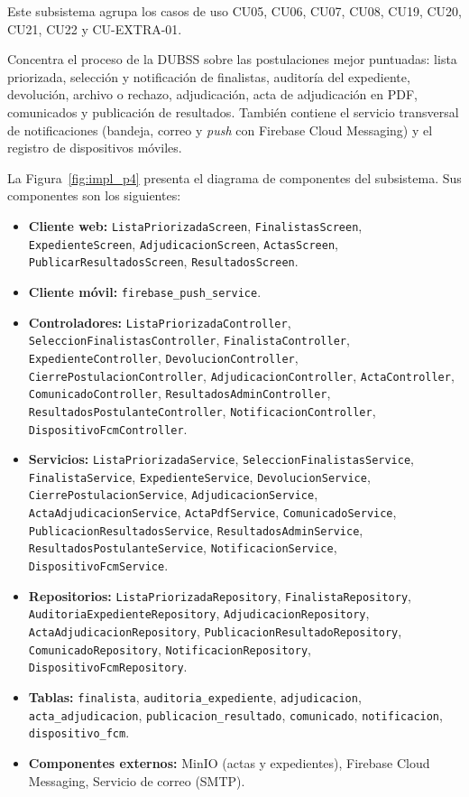 \label{sec:cap8_sub_p4}

Este subsistema agrupa los casos de uso CU05, CU06, CU07, CU08, CU19, CU20, CU21, CU22 y CU-EXTRA-01.

Concentra el proceso de la DUBSS sobre las postulaciones mejor puntuadas: lista priorizada, selección y notificación de finalistas, auditoría del expediente, devolución, archivo o rechazo, adjudicación, acta de adjudicación en PDF, comunicados y publicación de resultados. También contiene el servicio transversal de notificaciones (bandeja, correo y \textit{push} con Firebase Cloud Messaging) y el registro de dispositivos móviles.

La Figura~\ref{fig:impl_p4} presenta el diagrama de componentes del subsistema. Sus componentes son los siguientes:

\begin{itemize}
\item \textbf{Cliente web:} \texttt{ListaPriorizadaScreen}, \texttt{FinalistasScreen}, \texttt{ExpedienteScreen}, \texttt{AdjudicacionScreen}, \texttt{ActasScreen}, \texttt{PublicarResultadosScreen}, \texttt{ResultadosScreen}.
\item \textbf{Cliente móvil:} \texttt{firebase\_push\_service}.
\item \textbf{Controladores:} \texttt{ListaPriorizadaController}, \texttt{SeleccionFinalistasController}, \texttt{FinalistaController}, \texttt{ExpedienteController}, \texttt{DevolucionController}, \texttt{CierrePostulacionController}, \texttt{AdjudicacionController}, \texttt{ActaController}, \texttt{ComunicadoController}, \texttt{ResultadosAdminController}, \texttt{ResultadosPostulanteController}, \texttt{NotificacionController}, \texttt{DispositivoFcmController}.
\item \textbf{Servicios:} \texttt{ListaPriorizadaService}, \texttt{SeleccionFinalistasService}, \texttt{FinalistaService}, \texttt{ExpedienteService}, \texttt{DevolucionService}, \texttt{CierrePostulacionService}, \texttt{AdjudicacionService}, \texttt{ActaAdjudicacionService}, \texttt{ActaPdfService}, \texttt{ComunicadoService}, \texttt{PublicacionResultadosService}, \texttt{ResultadosAdminService}, \texttt{ResultadosPostulanteService}, \texttt{NotificacionService}, \texttt{DispositivoFcmService}.
\item \textbf{Repositorios:} \texttt{ListaPriorizadaRepository}, \texttt{FinalistaRepository}, \texttt{AuditoriaExpedienteRepository}, \texttt{AdjudicacionRepository}, \texttt{ActaAdjudicacionRepository}, \texttt{PublicacionResultadoRepository}, \texttt{ComunicadoRepository}, \texttt{NotificacionRepository}, \texttt{DispositivoFcmRepository}.
\item \textbf{Tablas:} \texttt{finalista}, \texttt{auditoria\_expediente}, \texttt{adjudicacion}, \texttt{acta\_adjudicacion}, \texttt{publicacion\_resultado}, \texttt{comunicado}, \texttt{notificacion}, \texttt{dispositivo\_fcm}.
\item \textbf{Componentes externos:} MinIO (actas y expedientes), Firebase Cloud Messaging, Servicio de correo (SMTP).
\end{itemize}

